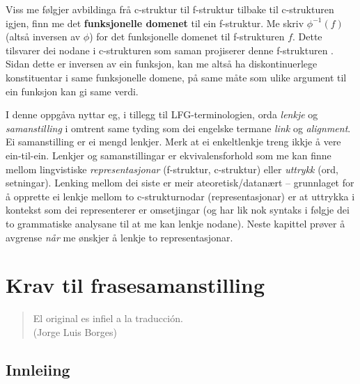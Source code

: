 \documentclass[12pt,a4paper,oneside,draft]{report}
\newcommand{\q}[2]{\begin{quotation}\raggedleft{}#1\\\vspace{0.2cm}(#2)\vspace{1.2cm}\end{quotation}}
\begin{document}
 Viss me følgjer avbildinga frå c\hyp{}struktur til f\hyp{}struktur tilbake til
 c\hyp{}strukturen igjen, finn me det \textbf{funksjonelle domenet} til ein
 f\hyp{}struktur. Me skriv $\phi^{-1}(f)$ (altså inversen av $\phi$) for
 det funksjonelle domenet til f\hyp{}strukturen $f$. Dette tilsvarer dei
 nodane i c\hyp{}strukturen som saman projiserer denne f\hyp{}strukturen
 \citep[s.~126]{bresnan2001lfs}. Sidan dette er inversen av ein
 funksjon, kan me altså ha diskontinuerlege konstituentar i same
 funksjonelle domene, på same måte som ulike argument til ein funksjon
 kan gi same verdi.

 I denne oppgåva nyttar eg, i tillegg til LFG-terminologien, orda
 \emph{lenkje} og \emph{samanstilling} i omtrent same tyding som dei engelske
 termane \emph{link} og \emph{alignment}. Ei samanstilling er ei mengd
 lenkjer. Merk at ei enkeltlenkje treng ikkje å vere ein-til-ein.
 Lenkjer og samanstillingar er ekvivalensforhold som me kan finne
 mellom lingvistiske \emph{representasjonar} (f\hyp{}struktur, c\hyp{}struktur) eller
 \emph{uttrykk} (ord, setningar). Lenking mellom dei siste er meir
 ateoretisk/datanært -- grunnlaget for å opprette ei lenkje mellom to
 c\hyp{}strukturnodar (representasjonar) er at uttrykka i kontekst som dei
 representerer er omsetjingar (og har lik nok syntaks i følgje dei to
 grammatiske analysane til at me kan lenkje nodane). Neste kapittel
 prøver å avgrense \emph{når} me ønskjer å lenkje to representasjonar.


\chapter{Krav til frasesamanstilling}
\label{sec-3}

\label{SEC:ideell}

   \q{El original es infiel a la traducción.}
   {Jorge Luis Borges}

\section{Innleiing}
\label{sec-3.1}
\end{document}
